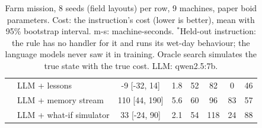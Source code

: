 \begin{table}[h!]
{\begin{tabular}{llcccccc}
 & LLM + lessons & -9 [-32, 14] & 1.8 & 52 & 82 & 0 & 46 \\
 & LLM + memory stream & 110 [44, 190] & 5.6 & 60 & 96 & 83 & 57 \\
 & LLM + what-if simulator & 33 [-24, 90] & 2.1 & 54 & 118 & 24 & 88 \\
\hline
\end{tabular}}
\caption{Farm mission, 8 seeds (field layouts) per row, 9 machines, paper boid parameters. Cost: the instruction's cost (lower is better), mean with 95\% bootstrap interval. m-s: machine-seconds. $^*$Held-out instruction: the rule has no handler for it and runs its wet-day behaviour; the language models never saw it in training. Oracle search simulates the true state with the true cost. LLM: qwen2.5:7b.}
\label{tab:farm}
\end{table}
